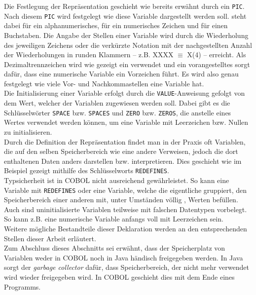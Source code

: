 Die Festlegung der Repräsentation geschieht wie bereits erwähnt durch ein \texttt{PIC}. Nach diesem \texttt{PIC} wird festgelegt wie diese Variable dargestellt werden soll.  steht dabei für ein alphanumerisches,  für ein numerisches Zeichen und  für einen Buchstaben. Die Angabe der Stellen einer Variable wird durch die Wiederholung des jeweiligen Zeichens oder die verkürzte Notation mit der nachgestellten Anzahl der Wiederholungen in runden Klammern -- z.B. XXXX $\equiv$ X(4) -- erreicht. Als Dezimaltrennzeichen wird wie gezeigt ein  verwendet und ein vorangestelltes  sorgt dafür, dass eine numerische Variable ein Vorzeichen führt. Es wird also genau festgelegt wie viele Vor- und Nachkommastellen eine Variable hat.\\

Die Initialisierung einer Variable erfolgt durch die \texttt{VALUE}-Anweisung gefolgt von dem Wert, welcher der Variablen zugewiesen werden soll. Dabei gibt es die Schlüsselwörter \texttt{SPACE} bzw. \texttt{SPACES} und \texttt{ZERO} bzw. \texttt{ZEROS}, die anstelle eines Wertes verwendet werden können, um eine Variable mit Leerzeichen bzw. Nullen zu initialisieren.\\

Durch die Definition der Repräsentation findet man in der Praxis oft Variablen, die auf den selben Speicherbereich wie eine andere Verweisen, jedoch die dort enthaltenen Daten anders darstellen bzw. interpretieren. Dies geschieht wie im Beispiel gezeigt mithilfe des Schlüsselworts \texttt{REDEFINES}.\\

Typsicherheit ist in COBOL nicht ausreichend gewährleistet. So kann eine Variable mit \texttt{REDEFINES} oder eine Variable, welche die eigentliche gruppiert, den Speicherbereich einer anderen mit, unter Umständen völlig , Werten befüllen. Auch sind uninitialisierte Variablen teilweise mit falschen Datentypen vorbelegt. So kann z.B. eine numerische Variable anfangs voll mit Leerzeichen sein.\\

Weitere mögliche Bestandteile dieser Deklaration werden an den entsprechenden Stellen dieser Arbeit erläutert.\\

Zum Abschluss dieses Abschnitts sei erwähnt, dass der Speicherplatz von Variablen weder in COBOL noch in Java händisch freigegeben werden. In Java sorgt der \textit{garbage collector} dafür, dass Speicherbereich, der nicht mehr verwendet wird wieder freigegeben wird. In COBOL geschieht dies mit dem Ende eines Programms.\\
